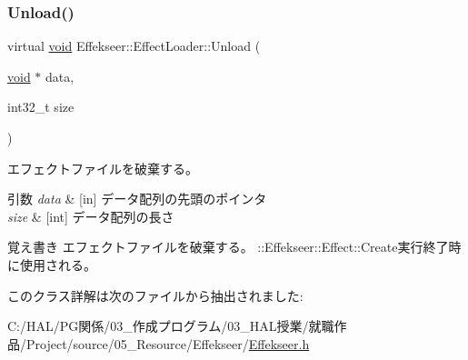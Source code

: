 \subsubsection{\texorpdfstring{Unload()}{Unload()}}
{\footnotesize\ttfamily virtual \mbox{\hyperlink{namespace_effekseer_ab34c4088e512200cf4c2716f168deb56}{void}} Effekseer\+::\+Effect\+Loader\+::\+Unload (\begin{DoxyParamCaption}\item[{\mbox{\hyperlink{namespace_effekseer_ab34c4088e512200cf4c2716f168deb56}{void}} $\ast$}]{data,  }\item[{int32\+\_\+t}]{size }\end{DoxyParamCaption})\hspace{0.3cm}{\ttfamily [pure virtual]}}



エフェクトファイルを破棄する。 


\begin{DoxyParams}{引数}
{\em data} & \mbox{[}in\mbox{]} データ配列の先頭のポインタ \\
\hline
{\em size} & \mbox{[}int\mbox{]} データ配列の長さ \\
\hline
\end{DoxyParams}
\begin{DoxyNote}{覚え書き}
エフェクトファイルを破棄する。 \+::\+Effekseer\+::\+Effect\+::\+Create実行終了時に使用される。 
\end{DoxyNote}


このクラス詳解は次のファイルから抽出されました\+:\begin{DoxyCompactItemize}
\item 
C\+:/\+H\+A\+L/\+P\+G関係/03\+\_\+作成プログラム/03\+\_\+\+H\+A\+L授業/就職作品/\+Project/source/05\+\_\+\+Resource/\+Effekseer/\mbox{\hyperlink{_effekseer_8h}{Effekseer.\+h}}\end{DoxyCompactItemize}
